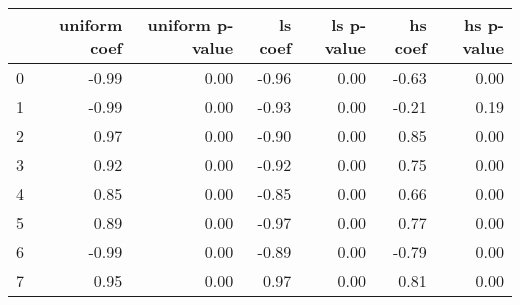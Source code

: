 \begin{tabular}{lrrrrrr}
\toprule
 & uniform coef & uniform p-value & ls coef & ls p-value & hs coef & hs p-value \\
\midrule
0 & -0.99 & 0.00 & -0.96 & 0.00 & -0.63 & 0.00 \\
1 & -0.99 & 0.00 & -0.93 & 0.00 & -0.21 & 0.19 \\
2 & 0.97 & 0.00 & -0.90 & 0.00 & 0.85 & 0.00 \\
3 & 0.92 & 0.00 & -0.92 & 0.00 & 0.75 & 0.00 \\
4 & 0.85 & 0.00 & -0.85 & 0.00 & 0.66 & 0.00 \\
5 & 0.89 & 0.00 & -0.97 & 0.00 & 0.77 & 0.00 \\
6 & -0.99 & 0.00 & -0.89 & 0.00 & -0.79 & 0.00 \\
7 & 0.95 & 0.00 & 0.97 & 0.00 & 0.81 & 0.00 \\
\bottomrule
\end{tabular}
